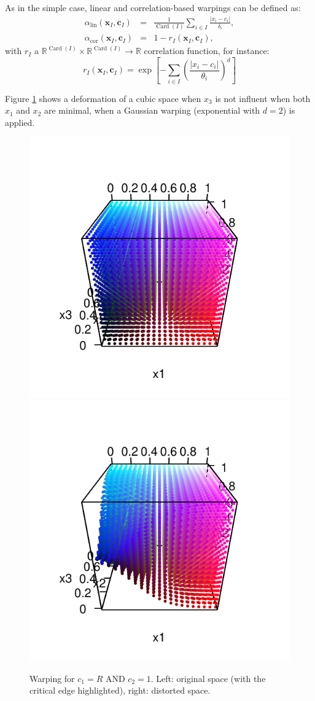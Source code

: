 \documentclass[a4paper,10pt]{article}
\newcommand{\x}{\mathbf{x}}
\newcommand{\cc}{\mathbf{c}}
\newcommand{\Rset}{\mathbb{R}}
\def\card{\operatorname{Card}}
\begin{document}
As in the simple case, linear and correlation-based warpings can be defined as:
\begin{eqnarray}
 \alpha_\text{lin}(\x_I,  \cc_I) &=& \frac{1}{\card(I)} \sum_{i \in I}\frac{\lvert x_i - c_i \rvert}{\delta_i}, \\
  \alpha_\text{cor}(\x_I,  \cc_I) &=& 1 - r_I(\x_I, \cc_I),
\end{eqnarray}
with $r_I$ a $\Rset^{\card(I)} \times \Rset^{\card(I)} \rightarrow \Rset$ correlation function, for instance:
$$r_I(\x_I, \cc_I) = \exp \left[ - \sum_{i \in I}\left(\frac{\lvert x_i - c_i \rvert}{\theta_i}\right)^d \right] $$


Figure \ref{fig:def3Dedge} shows a deformation of a cubic space when $x_3$ is not influent when both $x_1$ and $x_2$ are minimal, when a Gaussian warping (exponential with $d=2$) is applied.
 \begin{figure}[!ht]
 \centering
 \includegraphics[width=.4\textwidth]{def3Dedge.pdf}
 \includegraphics[width=.4\textwidth]{defAND.pdf}
 \caption{Warping for $c_1=R$ AND $c_2=1$. Left: original space (with the critical edge highlighted), right: distorted space. %
 }\label{fig:def3Dedge}
\end{figure}
\end{document}
